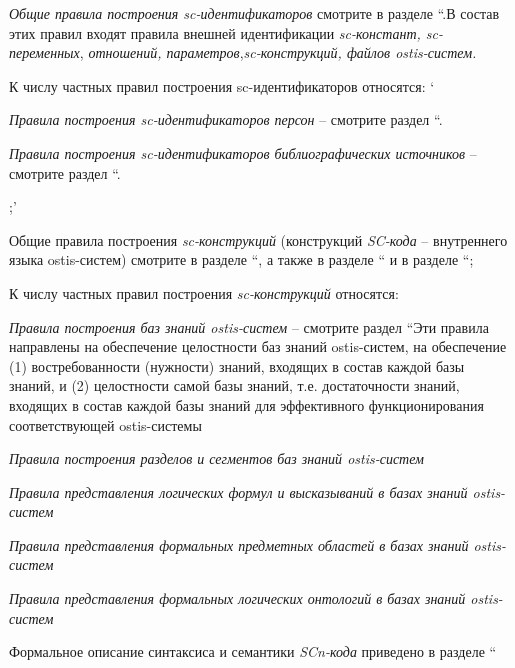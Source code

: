 \begin{SCn}
{\begin{scnvector}
{			            \textit{Общие правила построения sc-идентификаторов} смотрите в
			            разделе ``.В состав этих правил входят правила внешней
			            идентификации \textit{sc-констант, sc-переменных}, \textit{отношений,
				            параметров},\textit{sc-конструкций, файлов ostis-систем.}}
			\item{К числу частных правил построения sc-идентификаторов
			            относятся:
			            `		\begin{scnitemize}
				            \item\textit{Правила построения sc-идентификаторов
					            персон} -- смотрите раздел ``.
				            \item\textit{Правила построения sc-идентификаторов
					            библиографических источников} -- смотрите раздел ``.
			            \end{scnitemize}};'
			\item{Общие правила построения \textit{sc-конструкций}
			            (конструкций \textit{SC-кода} -- внутреннего языка ostis-систем) смотрите в
			            разделе ``, а также в разделе
			            `` и в разделе ``\nameref{sd_sc_code_semantic}};
			\item{К числу частных правил построения \textit{sc-конструкций}
			            относятся:
			            \begin{scnitemize}
				            \item \textit{Правила построения баз знаний
					            ostis-систем} -- смотрите раздел ``Эти правила направлены
				            на обеспечение целостности баз знаний ostis-систем, на обеспечение (1)
				            востребованности (нужности) знаний, входящих в состав каждой базы знаний, и (2)
				            целостности самой базы знаний, т.е. достаточности знаний, входящих в состав
				            каждой базы знаний для эффективного функционирования соответствующей
				            ostis-системы
				            \item \textit{Правила построения разделов и сегментов
					            баз знаний ostis-систем}
				            \item \textit{Правила представления логических формул и
					            высказываний в базах знаний ostis-систем}
				            \item \textit{Правила представления формальных
					            предметных областей в базах знаний ostis-систем}
				            \item \textit{Правила представления формальных
					            логических онтологий в базах знаний ostis-систем}
			            \end{scnitemize}}
			\item{Формальное описание синтаксиса и семантики
			            \textit{SCn-кода} приведено в разделе ``}
		\end{scnvector}
	}


\end{SCn}
